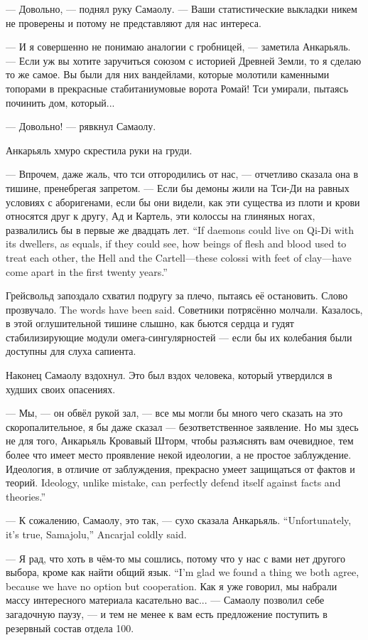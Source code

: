 --- Довольно, --- поднял руку Самаолу.
--- Ваши статистические выкладки никем не проверены и потому не представляют для нас интереса.

--- И я совершенно не понимаю аналогии с гробницей, --- заметила Анкарьяль.
--- Если уж вы хотите заручиться союзом с историей Древней Земли, то я сделаю то же самое.
Вы были для них вандейлами, которые молотили каменными топорами в прекрасные стабитаниумовые ворота Ромай!
Тси умирали, пытаясь починить дом, который...

--- Довольно! --- рявкнул Самаолу.

Анкарьяль хмуро скрестила руки на груди.

--- Впрочем, даже жаль, что тси отгородились от нас, --- отчетливо сказала она в тишине, пренебрегая запретом.
{--- Если бы демоны жили на Тси-Ди на равных условиях с аборигенами, если бы они видели, как эти существа из плоти и крови относятся друг к другу, Ад и Картель, эти колоссы на глиняных ногах, развалились бы в первые же двадцать лет.}
{``If daemons could live on Qi-Di with its dwellers, as equals, if they could see, how beings of flesh and blood used to treat each other, the Hell and the Cartell---these colossi with feet of clay---have come apart in the first twenty years.''}

Грейсвольд запоздало схватил подругу за плечо, пытаясь её остановить.
{Слово прозвучало.}
{The words have been said.}
Советники потрясённо молчали.
Казалось, в этой оглушительной тишине слышно, как бьются сердца и гудят стабилизирующие модули омега-сингулярностей --- если бы их колебания были доступны для слуха сапиента.

Наконец Самаолу вздохнул.
Это был вздох человека, который утвердился в худших своих опасениях.

--- Мы, --- он обвёл рукой зал, --- все мы могли бы много чего сказать на это скоропалительное, я бы даже сказал --- безответственное заявление.
Но мы здесь не для того, Анкарьяль Кровавый Шторм, чтобы разъяснять вам очевидное, тем более что имеет место проявление некой идеологии, а не простое заблуждение.
{Идеология, в отличие от заблуждения, прекрасно умеет защищаться от фактов и теорий.}
{Ideology, unlike mistake, can perfectly defend itself against facts and theories.''}

{--- К сожалению, Самаолу, это так, --- сухо сказала Анкарьяль.}
{``Unfortunately, it's true, Samajolu,'' Ancarjal coldly said.}

{--- Я рад, что хоть в чём-то мы сошлись, потому что у нас с вами нет другого выбора, кроме как найти общий язык.}
{``I'm glad we found a thing we both agree, because we have no option but cooperation.}
Как я уже говорил, мы набрали массу интересного материала касательно вас... --- Самаолу позволил себе загадочную паузу, --- и тем не менее к вам есть предложение поступить в резервный состав отдела 100.

